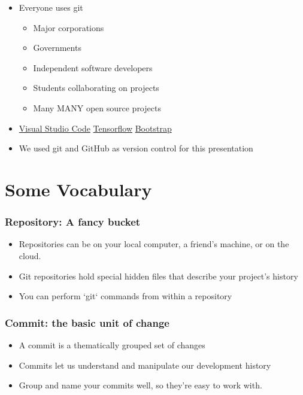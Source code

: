 \documentclass[unknownkeysallowed]{beamer}
\begin{document}
\begin{frame}
\begin{figure}
\begin{center}
                \end{center}
            \endminipage
        \end{figure}
    \begin{itemize}
        \item{Everyone uses git}
            \begin{itemize}
                \item{Major corporations}
                \item{Governments}
                \item{Independent software developers}
                \item{Students collaborating on projects}
                \item{Many MANY open source projects}
           \end{itemize}
   \item{\href{https://github.com/Microsoft/vscode}{Visual Studio Code} \hfill \href{https://github.com/tensorflow/tensorflow}{Tensorflow} \hfill \href{https://github.com/twbs/bootstrap}{Bootstrap}}
        \item{We used git and GitHub as version control for this presentation}
    \end{itemize}
\end{frame}

\section{Some Vocabulary}
\begin{frame}
	\frametitle{Repository: A fancy bucket}
	\begin{itemize}
	    \item{Repositories can be on your local computer, a friend's machine, or on the cloud.}
        \vspace{0.5cm}
	    \item{Git repositories hold special hidden files that describe your project's history}
        \vspace{0.5cm}
	    \item{You can perform `git` commands from within a repository}
	\end{itemize}
\end{frame}

\begin{frame}
	\frametitle{Commit: the basic unit of change}
	\begin{itemize}
	    \item{A commit is a thematically grouped set of changes}
        \vspace{0.5cm}
	    \item{Commits let us understand and manipulate our development history}
        \vspace{0.5cm}
	    \item{Group and name your commits well, so they're easy to work with.}
	\end{itemize}
\end{frame}
\end{document}
